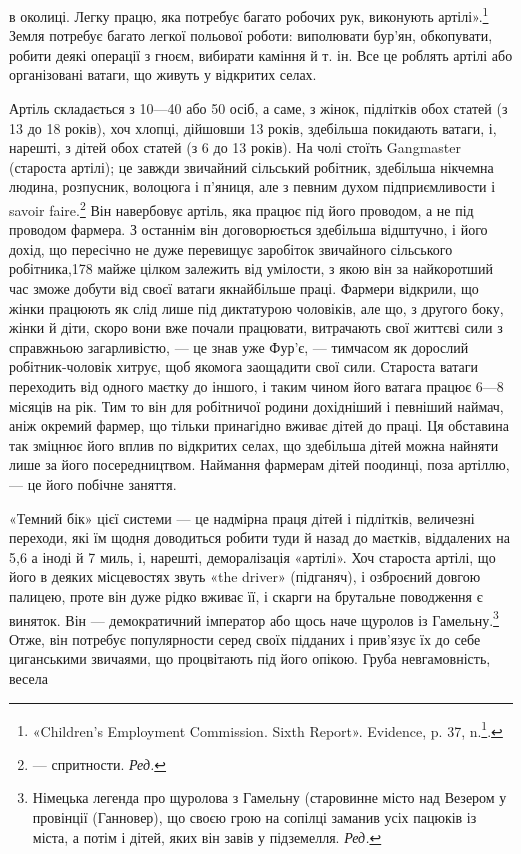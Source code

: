 в околиці. Легку працю, яка потребує багато робочих рук, виконують
артілі».\footnote{
«Children's Employment Commission. Sixth Report». Evidence,
p. 37, n.\footnote{
Однак деякі старости артілі доробляються до того, що стають
фармерами, які мають 500 акрів землі, або власниками цілого ряду будинків.
}.
} Земля потребує багато легкої польової роботи:
виполювати бур’ян, обкопувати, робити деякі операції з
гноєм, вибирати каміння й т. ін. Все це роблять артілі або організовані
ватаги, що живуть у відкритих селах.

Артіль складається з 10—40 або 50 осіб, а саме, з жінок,
підлітків обох статей (з 13 до 18 років), хоч хлопці, дійшовши
13 років, здебільша покидають ватаги, і, нарешті, з дітей обох
статей (з 6 до 13 років). На чолі стоїть Gangmaster (староста
артілі); це завжди звичайний сільський робітник, здебільша
нікчемна людина, розпусник, волоцюга і п’яниця, але з певним
духом підприємливости і savoir faire.\footnote*{
— спритности. \emph{Ред.}
} Він навербовує артіль,
яка працює під його проводом, а не під проводом фармера. З останнім
він договорюється здебільша відштучно, і його дохід, що
пересічно не дуже перевищує заробіток звичайного сільського
робітника,178 майже цілком залежить від умілости, з якою він
за найкоротший час зможе добути від своєї ватаги якнайбільше
праці. Фармери відкрили, що жінки працюють як слід лише під
диктатурою чоловіків, але що, з другого боку, жінки й діти,
скоро вони вже почали працювати, витрачають свої життєві
сили з справжньою загарливістю, — це знав уже Фур’є, — тимчасом
як дорослий робітник-чоловік хитрує, щоб якомога заощадити
свої сили. Староста ватаги переходить від одного маєтку
до іншого, і таким чином його ватага працює 6—8 місяців на
рік. Тим то він для робітничої родини дохідніший і певніший
наймач, аніж окремий фармер, що тільки принагідно вживає
дітей до праці. Ця обставина так зміцнює його вплив по відкритих
селах, що здебільша дітей можна найняти лише за його посередництвом.
Наймання фармерам дітей поодинці, поза артіллю, —
це його побічне заняття.

«Темний бік» цієї системи — це надмірна праця дітей і підлітків,
величезні переходи, які їм щодня доводиться робити туди
й назад до маєтків, віддалених на 5,6 а іноді й 7 миль, і, нарешті,
деморалізація «артілі». Хоч староста артілі, що його в деяких
місцевостях звуть «the driver» (підганяч), і озброєний довгою
палицею, проте він дуже рідко вживає її, і скарги на брутальне
поводження є виняток. Він — демократичний імператор або щось
наче щуролов із Гамельну.\footnote*{
Німецька легенда про щуролова з Гамельну (старовинне місто
над Везером у провінції (Ганновер), що своєю грою на сопілці заманив
усіх пацюків із міста, а потім і дітей, яких він завів у підземелля. \emph{Ред.}
} Отже, він потребує популярности
серед своїх підданих і прив’язує їх до себе циганськими звичаями,
що процвітають під його опікою. Груба невгамовність, весела